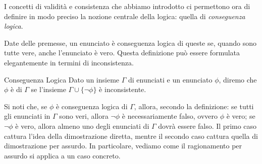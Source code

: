 I concetti di validità e consistenza che abbiamo introdotto ci permettono ora di definire in modo preciso la nozione centrale della logica: quella di \textit{conseguenza logica}.

Date delle premesse, un enunciato è conseguenza logica di queste se, quando sono tutte vere, anche l'enunciato è vero.
Questa definizione può essere formulata elegantemente in termini di inconsistenza.

\begin{definition}{Conseguenza Logica}
  Dato un insieme \(\Gamma\) di enunciati e un enunciato \(\phi\), diremo che \(\phi\) è  di \(\Gamma\) se l'insieme \(\Gamma \cup \{\neg \phi\}\) è inconsistente. %
\end{definition}

Si noti che, se \(\phi\) è conseguenza logica di \(\Gamma\), allora, secondo la definizione: se tutti gli enunciati in \(\Gamma\) sono veri, allora \(\neg \phi\) è necessariamente falso, ovvero \(\phi\) è vero; se \(\neg \phi\) è vero, allora almeno uno degli enunciati di \(\Gamma\) dovrà essere falso. Il primo caso cattura l'idea della dimostrazione diretta, mentre il secondo caso cattura quella di dimostrazione per assurdo.
In particolare, vediamo come il ragionamento per assurdo si applica a un caso concreto.

